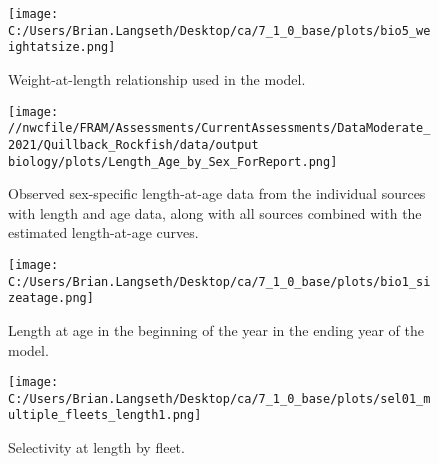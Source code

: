 \documentclass[11pt,
  english,
  a4paper,
]{article}
\begin{document}
\begin{figure}
\centering
\texttt{[image: C:/Users/Brian.Langseth/Desktop/ca/7\_1\_0\_base/plots/bio5\_weightatsize.png]}
\caption{Weight-at-length relationship used in the model.\label{fig:len-weight}}
\end{figure}

\tagmcend\tagstructend


\begin{figure}
\centering
\texttt{[image: //nwcfile/FRAM/Assessments/CurrentAssessments/DataModerate\_2021/Quillback\_Rockfish/data/output biology/plots/Length\_Age\_by\_Sex\_ForReport.png]}
\caption{Observed sex-specific length-at-age data from the individual sources with length and age data, along with all sources combined with the estimated length-at-age curves.\label{fig:len-age-data}}
\end{figure}

\tagmcend\tagstructend


\begin{figure}
\centering
\texttt{[image: C:/Users/Brian.Langseth/Desktop/ca/7\_1\_0\_base/plots/bio1\_sizeatage.png]}
\caption{Length at age in the beginning of the year in the ending year of the model.\label{fig:len-age-ss}}
\end{figure}

\tagmcend\tagstructend


\begin{figure}
\centering
\texttt{[image: C:/Users/Brian.Langseth/Desktop/ca/7\_1\_0\_base/plots/sel01\_multiple\_fleets\_length1.png]}
\caption{Selectivity at length by fleet.\label{fig:selex}}
\end{figure}

\tagmcend\tagstructend

\end{document}
